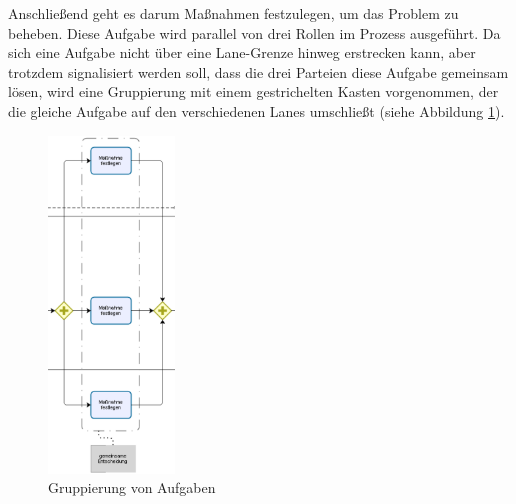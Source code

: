 \documentclass[a4paper,12pt]{report}
\begin{document}
Anschließend geht es darum Maßnahmen festzulegen, um das Problem zu beheben. Diese Aufgabe wird parallel von drei Rollen im Prozess ausgeführt. Da sich eine Aufgabe nicht über eine Lane-Grenze hinweg erstrecken kann, aber trotzdem signalisiert werden soll, dass die drei Parteien diese Aufgabe gemeinsam lösen, wird eine Gruppierung mit einem gestrichelten Kasten vorgenommen, der die gleiche Aufgabe auf den verschiedenen Lanes umschließt (siehe Abbildung \ref{shared_task}). 
\begin{figure}[ht]
\centering
\includegraphics[width=0.3\textwidth]{Images/shared_task}
\caption[Gruppierung von Aufgaben]{Gruppierung von Aufgaben}
\label{shared_task}
\end{figure}
\end{document}
